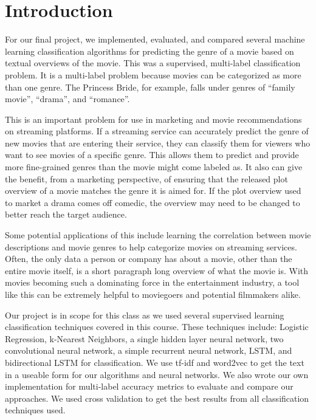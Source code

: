 \documentclass[sigconf]{acmart}
\begin{document}
%
\maketitle

\section{Introduction}
For our final project, we implemented, evaluated, and compared several machine learning classification algorithms for predicting the genre of a movie based on textual overviews of the movie.  This was a supervised, multi-label classification problem.  It is a multi-label problem because movies can be categorized as more than one genre. The Princess Bride, for example, falls under genres of ``family movie'', ``drama'', and ``romance''.  

This is an important problem for use in marketing and movie recommendations on streaming platforms. If a streaming service can accurately predict the genre of new movies that are entering their service, they can classify them for viewers who want to see movies of a specific genre. This allows them to predict and provide more fine-grained genres than the movie might come labeled as. It also can give the benefit, from a marketing perspective, of ensuring that the released plot overview of a movie matches the genre it is aimed for. If the plot overview used to market a drama comes off comedic, the overview may need to be changed to better reach the target audience. 

Some potential applications of this include learning the correlation between movie descriptions and movie genres to help categorize movies on streaming services.  Often, the only data a person or company has about a movie, other than the entire movie itself, is a short paragraph long overview of what the movie is.  With movies becoming such a dominating force in the entertainment industry, a tool like this can be extremely helpful to moviegoers and potential filmmakers alike.

Our project is in scope for this class as we used several supervised learning classification techniques covered in this course. These techniques include: Logistic Regression, k-Nearest Neighbors, a single hidden layer neural network, two convolutional neural network, a simple recurrent neural network, LSTM, and bidirectional LSTM for classification. We use tf-idf and word2vec to get the text in a useable form for our algorithms and neural networks. We also wrote our own implementation for multi-label accuracy metrics to evaluate and compare our approaches.  We used cross validation to get the best results from all classification techniques used. 
\end{document}
